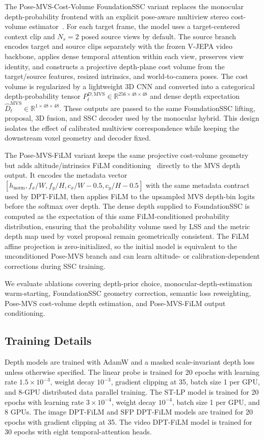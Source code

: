 The Pose-MVS-Cost-Volume FoundationSSC variant replaces the monocular depth-probability frontend with an explicit pose-aware multiview stereo cost-volume estimator~\cite{yao2018mvsnet}. 
For each target frame, the model uses a target-centered context clip and $N_s=2$ posed source views by default. 
The source branch encodes target and source clips separately with the frozen V-JEPA video backbone, applies dense temporal attention within each view, preserves view identity, and constructs a projective depth-plane cost volume from the target/source features, resized intrinsics, and world-to-camera poses. 
The cost volume is regularized by a lightweight 3D CNN and converted into a categorical depth-probability tensor $P_t^{D,\mathrm{MVS}}\in\mathbb{R}^{256\times48\times48}$ and dense depth expectation $\hat{D}_t^{\mathrm{MVS}}\in\mathbb{R}^{1\times48\times48}$. 
These outputs are passed to the same FoundationSSC lifting, proposal, 3D fusion, and SSC decoder used by the monocular hybrid. 
This design isolates the effect of calibrated multiview correspondence while keeping the downstream voxel geometry and decoder fixed.

The Pose-MVS-FiLM variant keeps the same projective cost-volume geometry but adds altitude/intrinsics FiLM conditioning~\cite{perez2018film} directly to the MVS depth output. 
It encodes the metadata vector $[h_{\mathrm{norm}}, f_x/W, f_y/H, c_x/W-0.5, c_y/H-0.5]$ with the same metadata contract used by DPT-FiLM, then applies FiLM to the upsampled MVS depth-bin logits before the softmax over depth. 
The dense depth supplied to FoundationSSC is computed as the expectation of this same FiLM-conditioned probability distribution, ensuring that the probability volume used by LSS and the metric depth map used by voxel proposal remain geometrically consistent. 
The FiLM affine projection is zero-initialized, so the initial model is equivalent to the unconditioned Pose-MVS branch and can learn altitude- or calibration-dependent corrections during SSC training.

We evaluate ablations covering depth-prior choice, monocular-depth-estimation warm-starting, FoundationSSC geometry correction, semantic loss reweighting, Pose-MVS cost-volume depth estimation, and Pose-MVS-FiLM output conditioning.

\subsection{Training Details}
Depth models are trained with AdamW and a masked scale-invariant depth loss unless otherwise specified. 
The linear probe is trained for 20 epochs with learning rate $1.5\times10^{-3}$, weight decay $10^{-3}$, gradient clipping at 35, batch size 1 per GPU, and 8-GPU distributed data parallel training. 
The ST-LP model is trained for 20 epochs with learning rate $3\times10^{-4}$, weight decay $10^{-4}$, batch size 1 per GPU, and 8 GPUs. 
The image DPT-FiLM and SFP DPT-FiLM models are trained for 20 epochs with gradient clipping at 35. 
The video DPT-FiLM model is trained for 30 epochs with eight temporal-attention heads.

